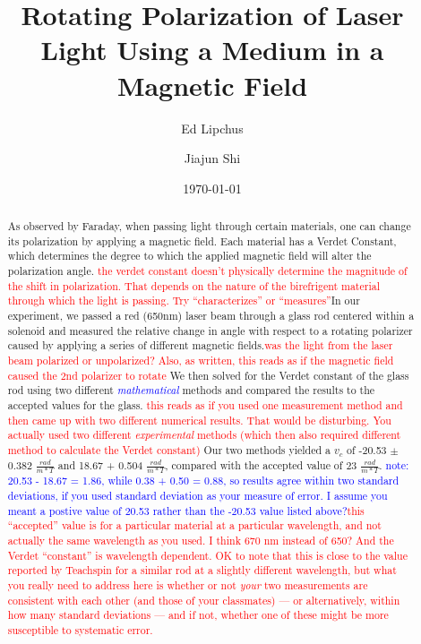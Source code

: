 \documentclass[prb,preprint]{revtex4-1}
\begin{document}
\title{Rotating Polarization of Laser Light Using a Medium in a Magnetic Field}

\author{Ed Lipchus}

\author{Jiajun Shi}

\date{\today}

\begin{abstract}

As observed by Faraday, when passing light through certain materials, one can change its polarization by applying a magnetic field. Each material has a Verdet Constant, which determines  the degree to which the applied magnetic field will alter the polarization angle. \textcolor{red}{the verdet constant doesn't physically determine the magnitude of the shift in polarization. That depends on the nature of the birefrigent material through which the light is passing. Try ``characterizes'' or ``measures''}In our experiment, we passed a red (650nm) laser beam through a glass rod centered within a solenoid and measured the relative change in angle with respect to a rotating polarizer caused by applying a series of different magnetic fields.\textcolor{red}{was the light from the laser beam polarized or unpolarized? Also, as written, this reads as if the magnetic field caused the 2nd polarizer to rotate} We then solved for the Verdet constant of the glass rod using two different \textcolor{blue}{\textit{mathematical}} methods and compared the results to the accepted values for the glass. \textcolor{red}{this reads as if you used one measurement method and then came up with two different numerical results. That would be disturbing. You actually used two different \textit{experimental} methods (which then also required different method to calculate the Verdet constant)} Our two methods yielded a $v_c$ of -20.53 $\pm$ 0.382 $\frac{rad}{m*T}$ and 18.67 + 0.504 $\frac{rad}{m*T}$, compared with the accepted value of 23 $\frac{rad}{m*T}$. \textcolor{blue}{note: 20.53 - 18.67 = 1.86, while 0.38 + 0.50 = 0.88, so results agree within two standard deviations, if you used standard deviation as your measure of error. I assume you meant a postive value of 20.53 rather than the -20.53 value listed above?}\textcolor{red}{this ``accepted'' value is for a particular material at a particular wavelength, and not actually the same wavelength as you used. I think 670 nm instead of 650? And the Verdet ``constant'' is wavelength dependent. OK to note that this is close to the value reported by Teachspin for a similar rod at a slightly different wavelength, but what you really need to address here is whether or not \textit{your} two measurements are consistent with each other (and those of your classmates) --- or alternatively, within how many standard deviations ---  and if not, whether one of these might be more susceptible to systematic error. }


\end{abstract}
\end{document}
